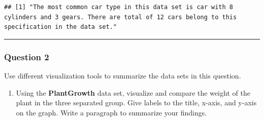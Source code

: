 \documentclass[
]{article}
\newenvironment{Shaded}{\begin{snugshade}}{\end{snugshade}}
\newcommand{\AttributeTok}[1]{\textcolor[rgb]{0.13,0.29,0.53}{#1}}
\newcommand{\CommentTok}[1]{\textcolor[rgb]{0.56,0.35,0.01}{\textit{#1}}}
\newcommand{\ConstantTok}[1]{\textcolor[rgb]{0.56,0.35,0.01}{#1}}
\newcommand{\DecValTok}[1]{\textcolor[rgb]{0.00,0.00,0.81}{#1}}
\newcommand{\FunctionTok}[1]{\textcolor[rgb]{0.13,0.29,0.53}{\textbf{#1}}}
\newcommand{\NormalTok}[1]{#1}
\newcommand{\OtherTok}[1]{\textcolor[rgb]{0.56,0.35,0.01}{#1}}
\newcommand{\SpecialCharTok}[1]{\textcolor[rgb]{0.81,0.36,0.00}{\textbf{#1}}}
\newcommand{\StringTok}[1]{\textcolor[rgb]{0.31,0.60,0.02}{#1}}
\providecommand{\tightlist}{%
  \setlength{\itemsep}{0pt}\setlength{\parskip}{0pt}}
\begin{document}
\begin{Shaded}
\end{Shaded}

\begin{verbatim}
## [1] "The most common car type in this data set is car with 8 cylinders and 3 gears. There are total of 12 cars belong to this specification in the data set."
\end{verbatim}

\begin{center}\rule{0.5\linewidth}{0.5pt}\end{center}

\subsubsection{Question 2}\label{question-2}

Use different visualization tools to summarize the data sets in this
question.

\begin{enumerate}
\def\labelenumi{\alph{enumi}.}
\tightlist
\item
  Using the \textbf{PlantGrowth} data set, visualize and compare the
  weight of the plant in the three separated group. Give labels to the
  title, x-axis, and y-axis on the graph. Write a paragraph to summarize
  your findings.
\end{enumerate}
\end{document}
